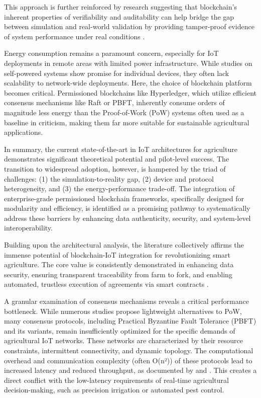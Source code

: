 \documentclass[12pt,onecolumn]{IEEEtran} %
\begin{document}
This approach is further reinforced by research suggesting that blockchain's inherent properties of verifiability and auditability can help bridge the gap between simulation and real-world validation by providing tamper-proof evidence of system performance under real conditions \cite{abunadi2022trafficawaresecuredcooperative, ouafiq2022datamanagementand}.

Energy consumption remains a paramount concern, especially for IoT deployments in remote areas with limited power infrastructure. While studies on self-powered systems \cite{raju2022aselfpoweredrealtime} show promise for individual devices, they often lack scalability to network-wide deployments. Here, the choice of blockchain platform becomes critical. Permissioned blockchains like Hyperledger, which utilize efficient consensus mechanisms like Raft or PBFT, inherently consume orders of magnitude less energy than the Proof-of-Work (PoW) systems often used as a baseline in criticism, making them far more suitable for sustainable agricultural applications.

In summary, the current state-of-the-art in IoT architectures for agriculture demonstrates significant theoretical potential and pilot-level success. The transition to widespread adoption, however, is hampered by the triad of challenges: (1) the simulation-to-reality gap, (2) device and protocol heterogeneity, and (3) the energy-performance trade-off. The integration of enterprise-grade permissioned blockchain frameworks, specifically designed for modularity and efficiency, is identified as a promising pathway to systematically address these barriers by enhancing data authenticity, security, and system-level interoperability.

Building upon the architectural analysis, the literature collectively affirms the immense potential of blockchain-IoT integration for revolutionizing smart agriculture. The core value is consistently demonstrated in enhancing data security, ensuring transparent traceability from farm to fork, and enabling automated, trustless execution of agreements via smart contracts \cite{aliyu2023blockchainbasedsmartfarm, ellahi2023blockchainbasedframeworksfor}.

A granular examination of consensus mechanisms reveals a critical performance bottleneck. While numerous studies propose lightweight alternatives to PoW, many consensus protocols, including Practical Byzantine Fault Tolerance (PBFT) and its variants, remain insufficiently optimized for the specific demands of agricultural IoT networks. These networks are characterized by their resource constraints, intermittent connectivity, and dynamic topology. The computational overhead and communication complexity (often O(n²)) of these protocols lead to increased latency and reduced throughput, as documented by \cite{ali2022blockchainenabledarchitecture} and \cite{morais2023surveyonintegration}. This creates a direct conflict with the low-latency requirements of real-time agricultural decision-making, such as precision irrigation or automated pest control.
\end{document}
